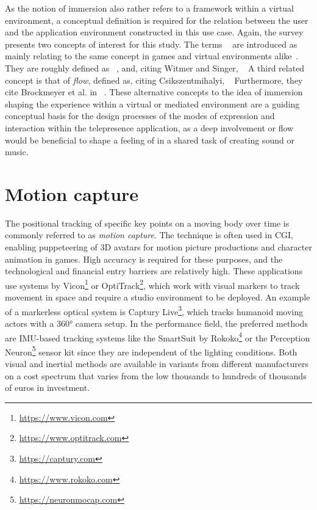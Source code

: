 As the notion of immersion also rather refers to a framework within a virtual environment, a conceptual definition is required for the relation between the user and the application environment constructed in this use case.
Again, the survey presents two concepts of interest for this study.
The terms ~\parencite[8]{surveyOfPresence} are introduced as mainly relating to the same concept in games and virtual environments alike~\parencite[8]{surveyOfPresence}.
They are roughly defined as ~\parencite[8]{surveyOfPresence}, and, citing Witmer and Singer, ~\parencite[8]{surveyOfPresence}
A third related concept is that of \emph{flow}, defined as, citing Csikszentmihalyi, ~\parencite[9]{surveyOfPresence}
Furthermore, they cite Brockmeyer et al. in ~\parencite[9]{surveyOfPresence}.
These alternative concepts to the idea of immersion shaping the experience within a virtual or mediated environment are a guiding conceptual basis for the design processes of the modes of expression and interaction within the telepresence application, as a deep involvement or flow would be beneficial to shape a feeling of  in a shared task of creating sound or music.

\section{Motion capture}
\label{sec:motion-capture}

The positional tracking of specific key points on a moving body over time is commonly referred to as \emph{motion capture}.
The technique is often used in \ac{CGI}, enabling puppeteering of \ac{3D} avatars for motion picture productions and character animation in games.
High accuracy is required for these purposes, and the technological and financial entry barriers are relatively high.
These applications use systems by Vicon\footnote{\url{https://www.vicon.com}} or OptiTrack\footnote{\url{https://www.optitrack.com}}, which work with visual markers to track movement in space and require a studio environment to be deployed.
An example of a markerless optical system is Captury Live\footnote{\url{https://captury.com}}, which tracks humanoid moving actors with a 360° camera setup.
In the performance field, the preferred methods are \ac{IMU}-based tracking systems like the SmartSuit by Rokoko\footnote{\url{https://www.rokoko.com}} or the Perception Neuron\footnote{\url{https://neuronmocap.com}} sensor kit since they are independent of the lighting conditions.
Both visual and inertial methods are available in variants from different manufacturers on a cost spectrum that varies from the low thousands to hundreds of thousands of euros in investment.


